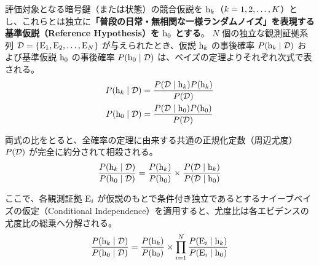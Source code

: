     評価対象となる暗号鍵（または状態）の競合仮説を $\mathrm{h}_{k}$（$k = 1, 2, \dots, K$）とし、これらとは独立に\textbf{「普段の日常・無相関な一様ランダムノイズ」を表現する基準仮説（Reference Hypothesis）を $\mathrm{h}_0$ とする}。
    $N$ 個の独立な観測証拠系列 $\mathcal{D} = \{\mathrm{E}_1, \mathrm{E}_2, \dots, \mathrm{E}_N\}$ が与えられたとき、仮説 $\mathrm{h}_{k}$ の事後確率 $P( \mathrm{h}_{k} \mid \mathcal{D} )$ および基準仮説 $\mathrm{h}_0$ の事後確率 $P( \mathrm{h}_0 \mid \mathcal{D} )$ は、ベイズの定理よりそれぞれ次式で表される。
    \begin{align}
        P( \mathrm{h}_{k} \mid \mathcal{D} ) &= \frac{P( \mathcal{D} \mid \mathrm{h}_{k} ) P( \mathrm{h}_{k} )}{P( \mathcal{D} )} \label{eq:bayes_hk} \\
        P( \mathrm{h}_0 \mid \mathcal{D} ) &= \frac{P( \mathcal{D} \mid \mathrm{h}_0 ) P( \mathrm{h}_0 )}{P( \mathcal{D} )} \label{eq:bayes_h0}
    \end{align}

    両式の比をとると、全確率の定理に由来する共通の正規化定数（周辺尤度）$P( \mathcal{D} )$ が完全に約分されて相殺される。
    \begin{equation}
        \frac{P( \mathrm{h}_{k} \mid \mathcal{D} )}{P( \mathrm{h}_0 \mid \mathcal{D} )} = \frac{P( \mathrm{h}_{k} )}{P( \mathrm{h}_0 )} \times \frac{P( \mathcal{D} \mid \mathrm{h}_{k} )}{P( \mathcal{D} \mid \mathrm{h}_0 )}
        \label{eq:odds_ratio_basic}
    \end{equation}

    ここで、各観測証拠 $\mathrm{E}_{i}$ が仮説のもとで条件付き独立であるとするナイーブベイズの仮定（Conditional Independence）を適用すると、尤度比は各エビデンスの尤度比の総乗へ分解される。
    \begin{equation}
        \frac{P( \mathrm{h}_{k} \mid \mathcal{D} )}{P( \mathrm{h}_0 \mid \mathcal{D} )} = \frac{P( \mathrm{h}_{k} )}{P( \mathrm{h}_0 )} \times \prod_{i=1}^{N} \frac{P( \mathrm{E}_{i} \mid \mathrm{h}_{k} )}{P( \mathrm{E}_{i} \mid \mathrm{h}_0 )}
        \label{eq:naive_bayes_odds_prod}
    \end{equation}

